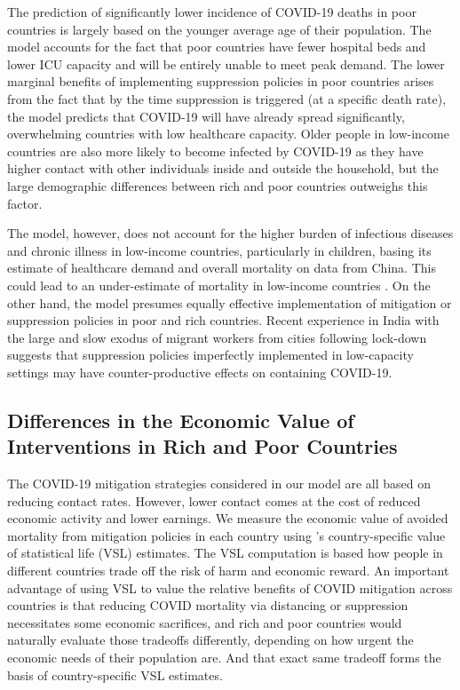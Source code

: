 \documentclass[11pt]{article}
\begin{document}
\begin{mdframed}
The prediction of significantly lower incidence of COVID-19 deaths in poor countries is largely based on the younger average age of their population. The model accounts for the fact that poor countries have fewer hospital beds and lower ICU capacity and will be entirely unable to meet peak demand. The lower marginal benefits of implementing suppression policies in poor countries arises from the fact that by the time suppression is triggered (at a specific death rate), the model predicts that COVID-19 will have already spread significantly, overwhelming countries with low healthcare capacity. Older people in low-income countries are also more likely to become infected by COVID-19 as they have higher contact with other individuals inside and outside the household, but the large demographic differences between rich and poor countries outweighs this factor.

The model, however, does not account for the higher burden of infectious diseases and chronic illness in low-income countries, particularly in children, basing its estimate of healthcare demand and overall mortality on data from China. This could lead to an under-estimate of mortality in low-income countries \parencite{walker2020}. On the other hand, the model presumes equally effective implementation of mitigation or suppression policies in poor and rich countries. Recent experience in India with the large and slow exodus of migrant workers from cities following lock-down suggests that suppression policies imperfectly implemented in low-capacity settings may have counter-productive effects on containing COVID-19.

\subsection{Differences in the Economic Value of Interventions in Rich and Poor Countries}

The COVID-19 mitigation strategies considered in our model are all based on reducing contact rates. However, lower contact comes at the cost of reduced economic activity and lower earnings. We measure the economic value of avoided mortality from mitigation policies in each country using \textcite{viscusi2017}'s country-specific value of statistical life (VSL) estimates. The VSL computation is based how people in different countries trade off the risk of harm and economic reward. An important advantage of using VSL to value the relative benefits of COVID mitigation across countries is that reducing COVID mortality via distancing or suppression necessitates some economic sacrifices, and rich and poor countries would naturally evaluate those tradeoffs differently, depending on how urgent the economic needs of their population are. And that exact same tradeoff forms the basis of country-specific VSL estimates.      


\end{mdframed}
\end{document}
